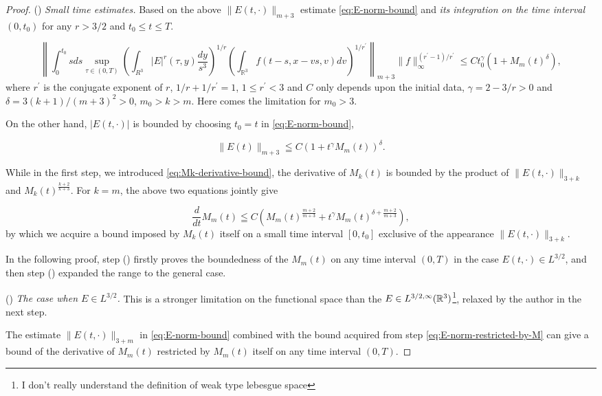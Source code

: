 \begin{proof}
() \textit{Small time estimates.} Based on the above $\|E(t,\cdot)\|_{m+3}$ estimate \eqref{eq:E-norm-bound} and \emph{its integration on the time interval} $(0,t_0)$ for any $r>3/2$ and $t_0\leq t\leq T$. 

\begin{equation}\label{eq:E-norm-restricted-by-M}\left\|\int_{0}^{t_{0}} s d s \sup _{\tau \in(0, T)}\left(\int_{R^{3}}|E|^{r}(\tau, y) \frac{d y}{s^{3}}\right)^{1 / r}\left(\int_{\mathbb{R}^{3}} f(t-s, x-v s, v) d v\right)^{1 / r^{\prime}}\right\|_{m+3}\|f\|_{\infty}^{\left(r^{\prime}-1\right) / r^{\prime}} \leq C t_{0}^{\gamma}\left(1+M_{m}(t)^{\delta}\right),\end{equation} where $r^\prime$ is the conjugate exponent of $r$, $1/r+1/r^\prime=1$, $1\leq r^\prime <3$ and $C$ only depends upon the initial data, $\gamma=2-3 / r>0$ and $\delta=3(k+1)/(m+3)^2>0$, $m_0>k>m$. Here comes the limitation for $m_0>3$.

On the other hand, $|E(t,\cdot)|$ is bounded by choosing $t_0=t$ in \eqref{eq:E-norm-bound},

$$\|E(t)\|_{m+3} \leqq C\left(1+t^{\gamma} M_{m}(t)\right)^{\delta}.$$

While in the first step, we introduced \eqref{eq:Mk-derivative-bound}, the derivative of  $M_{k}(t)$ is bounded by the product of $\|E(t,\cdot)\|_{3+k}$ and $M_{k}(t)^{\frac{k+2}{k+3}}$. For $k=m$, the above two equations jointly give

$$\frac{d}{d t} M_{m}(t) \leqq C\left(M_{m}(t)^{\frac{m+2}{m+3}}+t^{\gamma} M_{m}(t)^{\delta+\frac{m+2}{m+3}}\right) ,$$
by which we acquire a bound imposed by $M_{k}(t)$ itself on a small time interval $[0,t_0]$ exclusive of the appearance $\|E(t,\cdot)\|_{3+k}$.

In the following proof, step () firstly proves the boundedness of the $M_m(t)$ on any time interval $(0,T)$ in the case $E(t, \cdot)\in L^{3/2}$, and then step () expanded the range to the general case.

() \textit{The case when $E\in L^{3/2}$.} This is a stronger limitation on the functional space than the \textit{$E\in L^{3/2,\infty}({\mathbb{R}}^{3})$}\footnote{I don't really understand the definition of weak type lebesgue space}, relaxed by the author in the next step.

The estimate $\|E(t,\cdot)\|_{3+m}$ in \eqref{eq:E-norm-bound} combined with the bound acquired from step  \eqref{eq:E-norm-restricted-by-M} can give a bound of the derivative of $M_{m}(t)$ restricted by $M_{m}(t)$ itself on any time interval $(0,T)$.


\end{proof}
